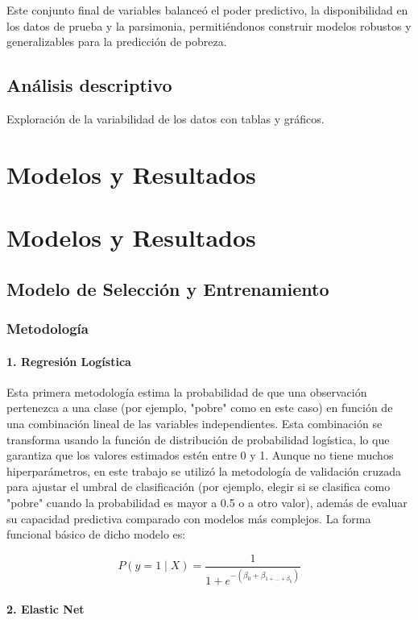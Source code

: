 \documentclass[12pt,a4paper,onecolumn]{article}
\begin{document}
Este conjunto final de variables balanceó el poder predictivo, la disponibilidad en los datos de prueba y la parsimonia, permitiéndonos construir modelos robustos y generalizables para la predicción de pobreza.

\subsection{Análisis descriptivo}
Exploración de la variabilidad de los datos con tablas y gráficos.

\section{Modelos y Resultados}
\section{Modelos y Resultados}
\subsection{Modelo de Selección y Entrenamiento}

\subsubsection{Metodología}

\paragraph{1. Regresión Logística}

Esta primera metodología estima la probabilidad de que una observación pertenezca a una clase (por ejemplo, "pobre" como en este caso) en función de una combinación lineal de las variables independientes. Esta combinación se transforma usando la función de distribución de probabilidad logística, lo que garantiza que los valores estimados estén entre 0 y 1. Aunque no tiene muchos hiperparámetros, en este trabajo se utilizó la metodología de validación cruzada para ajustar el umbral de clasificación (por ejemplo, elegir si se clasifica como "pobre" cuando la probabilidad es mayor a 0.5 o a otro valor), además de evaluar su capacidad predictiva comparado con modelos más complejos. La forma funcional básico de dicho modelo es:

$$P\left( y = 1 \middle| X \right) = \frac{1}{1 + e^{- (\beta_{0} + \beta_{1 + \ldots + \beta_{k}})}}$$

\paragraph{2. Elastic Net}
\end{document}
